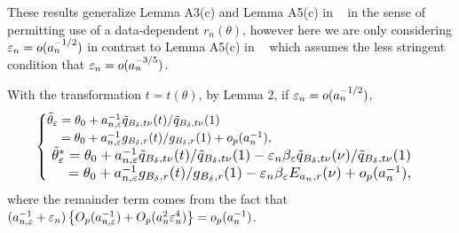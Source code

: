 	These results generalize Lemma A3(c) and Lemma A5(c) in ~\cite{Li2017} in the sense of permitting use of a data-dependent $r_n(\theta)$, however here we are only considering $\varepsilon_n = o(a_n^{-1/2})$ in contrast to Lemma A5(c) in ~\cite{Li2017} which assumes the less stringent condition that $\varepsilon_n = o(a_n^{-3/5})$.
	
	With the transformation $t=t(\theta)$, by Lemma 2, if $\varepsilon_{n}=o(a_{n}^{-1/2})$,
	\begin{eqnarray}
	\begin{cases}
	\tilde{\theta}_{\veps}=\theta_{0}+a_{n,\veps}^{-1}\tilde{q}_{B_{\delta},t\nu}(t)/\tilde{q}_{B_{\delta},t\nu}(1)\\
	\hspace{4mm}=\theta_{0}+a_{n,\veps}^{-1}g_{B_{\delta},r}(t)/g_{B_{\delta},r}(1)+o_{p}(a_{n}^{-1}),\\
	\resizebox{0.85\hsize}{!}{
	$\tilde{\theta}_{\veps}^{*}=\theta_{0}+a_{n,\veps}^{-1}\tilde{q}_{B_{\delta},t\nu}(t)/\tilde{q}_{B_{\delta},t\nu}(1)-\veps_{n}\beta_{\veps}\tilde{q}_{B_{\delta},t\nu}(\nu)/\tilde{q}_{B_{\delta},t\nu}(1)$}\\
	\resizebox{0.85\hsize}{!}{
	$\hspace{4mm} =\theta_{0}+a_{n,\veps}^{-1}g_{B_{\delta},r}(t)/g_{B_{\delta},r}(1)-\veps_{n}\beta_{\veps}E_{a_{n},r}(\nu)+o_{p}(a_{n}^{-1}),$}
	\end{cases}\label{eq4}
	\end{eqnarray}
	where the remainder term comes from the fact that $(a_{n,\varepsilon}^{-1}+\varepsilon_{n})\left\{ O_{p}(a_{n,\varepsilon}^{-1})+O_{p}(a_{n}^{2}\varepsilon_{n}^{4})\right\} =o_{p}(a_{n}^{-1})$.
	
